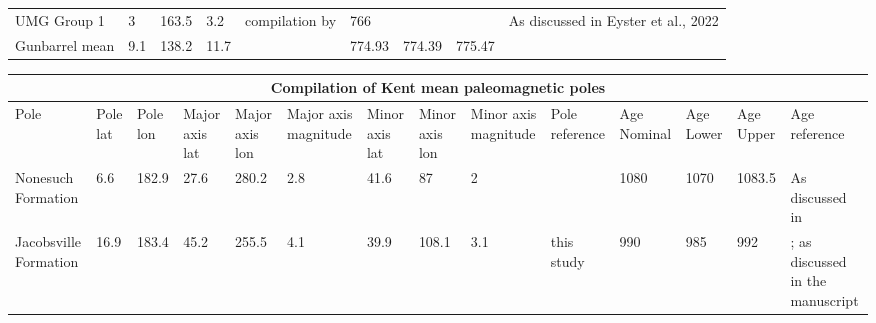 \begin{table}
\begin{tabular}{p{4cm}lllp{4cm}p{1.3cm}p{1.2cm}p{1.2cm}p{4cm}}
UMG Group 1                                                & 3        & 163.5    & 3.2  & compilation by \cite{Eyster2019a}                                    & 766        &          &          & As discussed in Eyster et al., 2022                 \\
Gunbarrel mean                                             & 9.1      & 138.2    & 11.7 & \cite{Eyster2019a}                                                   & 774.93     & 774.39   & 775.47   &                                                    
\end{tabular}
\label{tab:pole_compilation}
\end{table}

\clearpage

\begin{table}
\begin{scriptsize}
\begin{tabular}{p{1.5cm}p{1cm}p{1cm}p{1cm}p{1cm}p{1cm}p{1cm}p{1cm}p{1cm}p{1cm}p{1cm}p{1cm}p{1cm}p{2cm}}
\hline
\multicolumn{14}{c}{Compilation of Kent mean paleomagnetic poles}                                                                                                                                                                                           \\ \hline 
Pole                  & Pole lat & Pole lon & Major axis lat & Major axis lon & Major axis magnitude & Minor axis lat & Minor axis lon & Minor axis magnitude & Pole reference         & Age Nominal & Age Lower & Age Upper & Age reference                                       \\
Nonesuch Formation    & 6.6      & 182.9    & 27.6           & 280.2          & 2.8                  & 41.6           & 87             & 2                    & \cite{Slotznick2023a} & 1080       & 1070     & 1083.5   & As discussed in \cite{Swanson-Hysell2019a}         \\
Jacobsville Formation & 16.9    & 183.4    & 45.2           & 255.5          & 4.1                    & 39.9           & 108.1          & 3.1                  & this study             & 990        & 985      & 992     & \cite{Hodgin2022a}; as discussed in the manuscript
\end{tabular}
\end{scriptsize}
\end{table}

\clearpage


